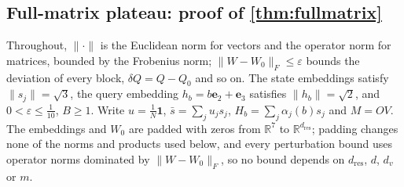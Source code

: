 \subsection{Full-matrix plateau: proof of \texorpdfstring{\cref{thm:fullmatrix}}{the full-matrix theorem}}
\label{app:fullmatrix}
Throughout, $\|\cdot\|$ is the Euclidean norm for vectors and the operator norm for matrices, bounded by the Frobenius norm;
$\|W-W_0\|_F\le\varepsilon$ bounds the deviation of every block, $\delta Q=Q-Q_0$ and so on. The state embeddings satisfy $\|s_j\|=\sqrt3$,
the query embedding $h_b=b\bm e_2+\bm e_3$ satisfies $\|h_b\|=\sqrt2$, and $0<\varepsilon\le\tfrac{1}{10}$, $B\ge1$.
Write $u=\tfrac{1}{N}\bm1$, $\bar s=\sum_j u_js_j$, $H_b=\sum_j\alpha_j(b)s_j$ and $M=OV$.
The embeddings and $W_0$ are padded with zeros from $\mathbb R^7$ to $\mathbb R^{d_{\mathrm{res}}}$; padding changes none of the norms and products used below,
and every perturbation bound uses operator norms dominated by $\|W-W_0\|_F$, so no bound depends on $d_{\mathrm{res}}$, $d$, $d_v$ or $m$.

